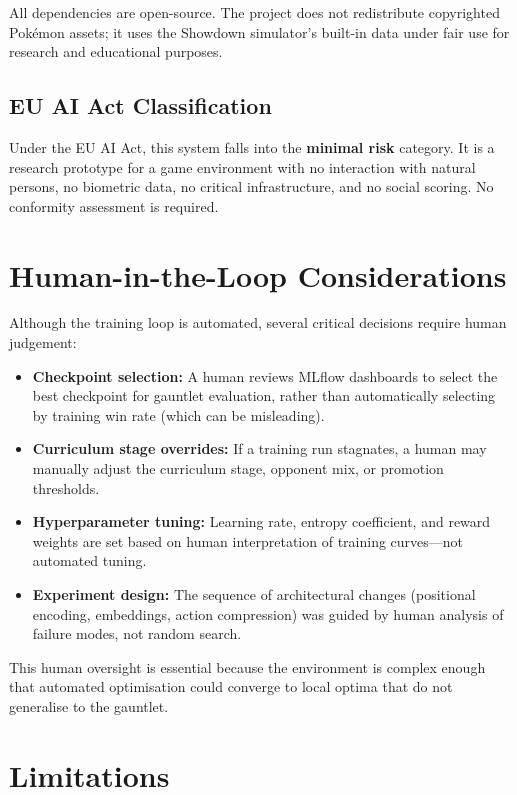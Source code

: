All dependencies are open-source.  The project does not redistribute
copyrighted Pok\'{e}mon assets; it uses the Showdown simulator's built-in data
under fair use for research and educational purposes.

\subsection{EU AI Act Classification}

Under the EU AI Act, this system falls into the \textbf{minimal risk}
category.  It is a research prototype for a game environment with no
interaction with natural persons, no biometric data, no critical
infrastructure, and no social scoring.  No conformity assessment is required.

\section{Human-in-the-Loop Considerations}

Although the training loop is automated, several critical decisions require
human judgement:

\begin{itemize}
  \item \textbf{Checkpoint selection:} A human reviews MLflow dashboards to
        select the best checkpoint for gauntlet evaluation, rather than
        automatically selecting by training win rate (which can be misleading).
  \item \textbf{Curriculum stage overrides:} If a training run stagnates, a
        human may manually adjust the curriculum stage, opponent mix, or
        promotion thresholds.
  \item \textbf{Hyperparameter tuning:} Learning rate, entropy coefficient,
        and reward weights are set based on human interpretation of training
        curves---not automated tuning.
  \item \textbf{Experiment design:} The sequence of architectural changes
        (positional encoding, embeddings, action compression) was guided by
        human analysis of failure modes, not random search.
\end{itemize}

This human oversight is essential because the environment is complex enough
that automated optimisation could converge to local optima that do not
generalise to the gauntlet.

\section{Limitations}

